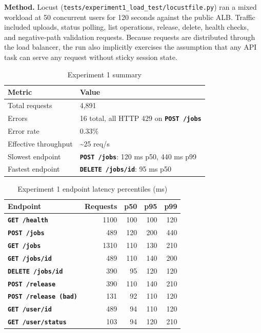 \documentclass[10pt,letterpaper]{article}
\newcommand{\code}[1]{\texttt{\small #1}}
\newcommand{\http}[1]{\textbf{\texttt{#1}}}
\begin{document}
\textbf{Method.} Locust (\code{tests/experiment1\_load\_test/locustfile.py}) ran a mixed workload at 50 concurrent users for 120 seconds against the public ALB. Traffic included uploads, status polling, list operations, release, delete, health checks, and negative-path validation requests. Because requests are distributed through the load balancer, the run also implicitly exercises the assumption that any API task can serve any request without sticky session state.

\begin{table}[H]
\centering
\caption{Experiment 1 summary}
\begin{tabularx}{\linewidth}{@{}lX@{}}
\toprule
\textbf{Metric} & \textbf{Value} \\
\midrule
Total requests & 4,891 \\
Errors & 16 total, all HTTP 429 on \http{POST /jobs} \\
Error rate & 0.33\% \\
Effective throughput & \textasciitilde25 req/s \\
Slowest endpoint & \http{POST /jobs}: 120 ms p50, 440 ms p99 \\
Fastest endpoint & \http{DELETE /jobs/{id}}: 95 ms p50 \\
\bottomrule
\end{tabularx}
\end{table}

\begin{table}[H]
\centering
\caption{Experiment 1 endpoint latency percentiles (ms)}
\begin{tabular}{@{}lrrrr@{}}
\toprule
\textbf{Endpoint} & \textbf{Requests} & \textbf{p50} & \textbf{p95} & \textbf{p99} \\
\midrule
\http{GET /health}         & 1100 & 100 & 100 & 120 \\
\http{POST /jobs}          &  489 & 120 & 200 & 440 \\
\http{GET /jobs}           & 1310 & 110 & 130 & 210 \\
\http{GET /jobs/{id}}      &  489 & 110 & 140 & 200 \\
\http{DELETE /jobs/{id}}   &  390 &  95 & 120 & 120 \\
\http{POST /release}       &  390 & 110 & 140 & 210 \\
\http{POST /release (bad)} &  131 &  92 & 110 & 120 \\
\http{GET /user/{id}}      &  489 &  94 & 110 & 120 \\
\http{GET /user/status}    &  103 &  94 & 120 & 210 \\
\bottomrule
\end{tabular}
\end{table}
\end{document}
